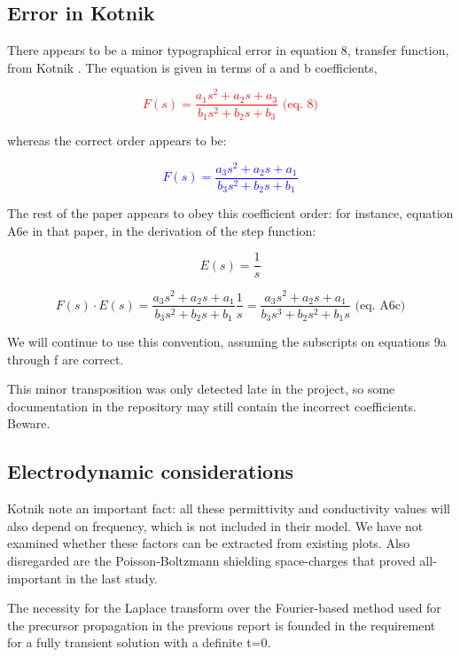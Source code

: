 \documentclass[fleqn,10pt]{paper}
\begin{document}
\subsection*{Error in Kotnik}

\begin{tcolorbox}
	
	There appears to be a minor typographical error in equation 8, transfer function, from Kotnik \cite{Time1998}. The equation is given in terms of a and b coefficients,
	
	\textcolor{red}{$$F(s) = \frac{a_1 s^2 + a_2 s + a_3}{b_1 s^2 + b_2 s + b_3} \text{ (eq. 8)}$$}
	
	whereas the correct order appears to be:
	
	\textcolor{blue}{$$F(s) = \frac{a_3 s^2 + a_2 s + a_1}{b_3 s^2 + b_2 s + b_1}$$}
	
	The rest of the paper appears to obey this coefficient order: for instance, equation A6e in that paper, in the derivation of the step function:
	
	$$E(s) = \frac{1}{s}$$
	
	$$F(s) \cdot E(s) = \frac{a_3 s^2 + a_2 s + a_1}{b_3 s^2 + b_2 s + b_1} \frac{1}{s} = \frac{a_3 s^2 + a_2 s + a_1}{b_3 s^3 + b_2 s^2 + b_1 s} \text{ (eq. A6c)}$$ 	%
	
	We will continue to use this convention, assuming the subscripts on equations 9a through f are correct. 
	
	This minor transposition was only detected late in the project, so some documentation in the repository may still contain the incorrect coefficients. Beware.

\end{tcolorbox}



\subsection*{Electrodynamic considerations}

Kotnik note an important fact: all these permittivity and conductivity values will also depend on frequency, which is not included in their model. We have not examined whether these factors can be extracted from existing plots. Also disregarded are the Poisson-Boltzmann shielding space-charges that proved all-important in the last study. 

The necessity for the Laplace transform over the Fourier-based method used for the precursor propagation in the previous report is founded in the requirement for a fully transient solution with a definite t=0.
\end{document}

